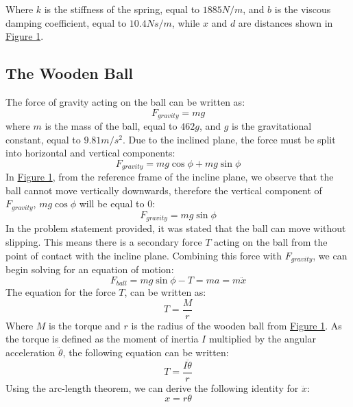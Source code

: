 \documentclass[a4paper,10pt,reqno]{amsart}
\numberwithin{equation}{section}
\begin{document}
Where $k$ is the stiffness of the spring, equal to $1885 N/m$, and $b$ is the viscous damping coefficient, equal to $10.4 Ns/m$, while $x$ and $d$ are distances shown in \hyperref[fig:system]{Figure 1}.

\subsection{The Wooden Ball}
The force of gravity acting on the ball can be written as:
\begin{equation*}
\label{eq:grav}
    F_{gravity}=mg
\end{equation*}
where $m$ is the mass of the ball, equal to $462g$, and $g$ is the gravitational constant, equal to $9.81m/s^2$. Due to the inclined plane, the force must be split into horizontal and vertical components:
\begin{equation*}
\label{eq:grav_resolved}
    F_{gravity}=mg\cos{\phi}+mg\sin{\phi}
\end{equation*}
In \hyperref[fig:system]{Figure 1}, from the reference frame of the incline plane, we observe that the ball cannot move vertically downwards, therefore the vertical component of $F_{gravity}$, $mg\cos{\phi}$ will be equal to 0:
\begin{equation*}
\label{eq:grav_sin}
    F_{gravity}=mg\sin{\phi}
\end{equation*}
In the problem statement provided, it was stated that the ball can move without slipping. This means there is a secondary force $T$ acting on the ball from the point of contact with the incline plane. Combining this force with $F_{gravity}$, we can begin solving for an equation of motion:
\begin{equation}
\label{eq:ball_1}
    F_{ball}=mg\sin{\phi}-T=ma=m\ddot x
\end{equation}
The equation for the force $T$, can be written as:
\begin{equation*}
\label{eq:torque_1}
    T=\frac{M}{r}
\end{equation*}
Where $M$ is the torque and $r$ is the radius of the wooden ball from \hyperref[fig:system]{Figure 1}. As the torque is defined as the moment of inertia $I$ multiplied by the angular acceleration $\ddot \theta$, the following equation can be written:
\begin{equation}
\label{eq:torque_2}
    T=\frac{I\ddot \theta}{r}
\end{equation}
Using the arc-length theorem, we can derive the following identity for $\ddot x$:
\begin{equation*}
    x=r\theta
\end{equation*}
\end{document}
